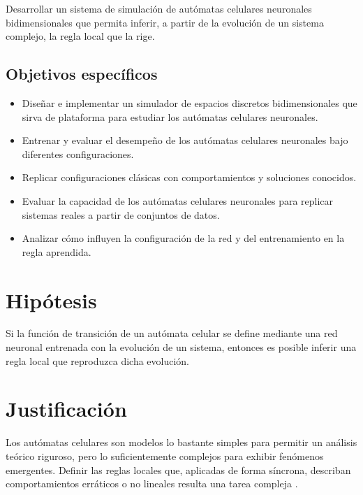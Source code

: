 Desarrollar un sistema de simulación de autómatas celulares neuronales bidimensionales que permita inferir, a partir de la evolución de un sistema complejo, la regla local que la rige.

\subsection{Objetivos específicos}

\begin{itemize}
	
	\item Diseñar e implementar un simulador de espacios discretos bidimensionales que sirva de plataforma para estudiar los autómatas celulares neuronales.
	
	\item Entrenar y evaluar el desempeño de los autómatas celulares neuronales bajo diferentes configuraciones.
	
	\item Replicar configuraciones clásicas con comportamientos y soluciones conocidos.
	
	\item Evaluar la capacidad de los autómatas celulares neuronales para replicar sistemas reales a partir de conjuntos de datos.
	
	\item Analizar cómo influyen la configuración de la red y del entrenamiento en la regla aprendida.
	
\end{itemize}

\section{Hipótesis}

Si la función de transición de un autómata celular se define mediante una red neuronal entrenada con la evolución de un sistema, entonces es posible inferir una regla local que reproduzca dicha evolución.

\section{Justificación}

Los autómatas celulares son modelos lo bastante simples para permitir un análisis teórico riguroso, pero lo suficientemente complejos para exhibir fenómenos emergentes. Definir las reglas locales que, aplicadas de forma síncrona, describan comportamientos erráticos o no lineales resulta una tarea compleja \cite{computationalBiology2016}. 

